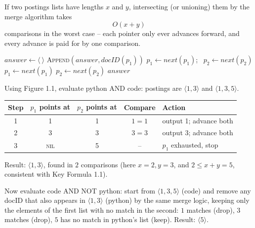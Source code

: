 \documentclass[11pt, a4paper]{article}
\begin{document}
\begin{formulabox}
If two postings lists have lengths $x$ and $y$, intersecting (or unioning) them by the merge algorithm takes
\[
O(x+y)
\]
comparisons in the worst case -- each pointer only ever advances forward, and every advance is paid for by one comparison.
\end{formulabox}

\begin{algorithm}[H]
\caption{\textsc{IntersectPostings}$(p_1, p_2)$}
\begin{algorithmic}[1]
\State $answer \gets \langle\ \rangle$
    \State \textsc{Append}$(answer, docID(p_1))$
    \State $p_1 \gets next(p_1)$; \ $p_2 \gets next(p_2)$
    \State $p_1 \gets next(p_1)$
  \Else
    \State $p_2 \gets next(p_2)$
  \EndIf
\EndWhile
\State \Return $answer$
\end{algorithmic}
\end{algorithm}

\begin{examplebox}
Using Figure 1.1, evaluate \textsf{python AND code}: postings are $\langle 1,3\rangle$ and $\langle 1,3,5\rangle$.

\begin{center}
\begin{tabular}{@{}ccccl@{}}
\toprule
Step & $p_1$ points at & $p_2$ points at & Compare & Action \\
\midrule
1 & 1 & 1 & $1=1$ & output 1; advance both \\
2 & 3 & 3 & $3=3$ & output 3; advance both \\
3 & \textsc{nil} & 5 & -- & $p_1$ exhausted, stop \\
\bottomrule
\end{tabular}
\end{center}
Result: $\langle 1,3\rangle$, found in $2$ comparisons (here $x=2,y=3$, and $2 \le x+y=5$, consistent with Key Formula 1.1).

Now evaluate \textsf{code AND NOT python}: start from $\langle 1,3,5\rangle$ (code) and remove any docID that also appears in $\langle 1,3\rangle$ (python) by the same merge logic, keeping only the elements of the first list with no match in the second: $1$ matches (drop), $3$ matches (drop), $5$ has no match in python's list (keep). Result: $\langle 5\rangle$.
\end{examplebox}
\end{document}
